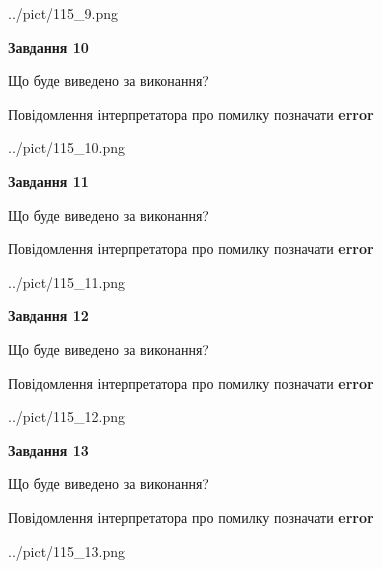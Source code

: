 \documentclass[11pt, ukrainian]{article}
\begin{document}
{\begin {large}
\begin{center}
	{../pict/115_9.png}
\end{center}
\newpage

{\begin {center}\textbf{Завдання 10}\end {center}}\par
Що буде виведено за виконання? \par
Повідомлення інтерпретатора про помилку позначати \textbf{error}

\begin{center}
	{../pict/115_10.png}
\end{center}
\newpage

{\begin {center}\textbf{Завдання 11}\end {center}}\par
Що буде виведено за виконання? \par
Повідомлення інтерпретатора про помилку позначати \textbf{error}

\begin{center}
	{../pict/115_11.png}
\end{center}
\newpage

{\begin {center}\textbf{Завдання 12}\end {center}}\par
Що буде виведено за виконання? \par
Повідомлення інтерпретатора про помилку позначати \textbf{error}

\begin{center}
	{../pict/115_12.png}
\end{center}
\newpage

{\begin {center}\textbf{Завдання 13}\end {center}}\par
Що буде виведено за виконання? \par
Повідомлення інтерпретатора про помилку позначати \textbf{error}

\begin{center}
	{../pict/115_13.png}
\end{center}
\newpage


\end{large}}
\end{document}
